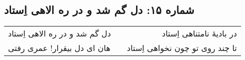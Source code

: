 \begin{center}
\section*{شماره ۱۵: دل گم شد و در ره الاهی اِستاد}
\label{sec:015}
\begin{longtable}{l p{0.5cm} r}
دل گم شد و در ره الاهی اِستاد
&&
در بادیهٔ نامتناهی اِستاد
\\
هان ای دل بیقرار! عمری رفتی
&&
تا چند روی تو چون نخواهی اِستاد
\\
\end{longtable}
\end{center}
